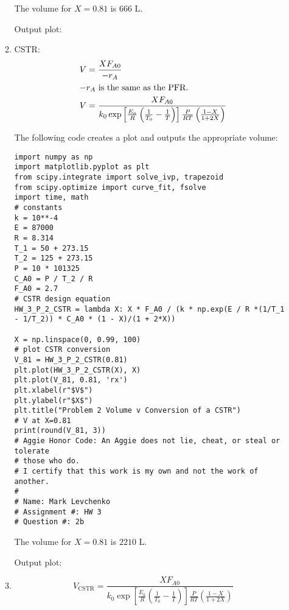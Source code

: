 \documentclass[12pt]{article}
\begin{document}
\begin{enumerate}
\begin{enumerate}
        The volume for $X=0.81$ is $\boxed{666\text{ L}}$.

        Output plot:

        

        
        \item CSTR:
        \begin{align*}
            V &= \frac{XF_{A0}}{-r_A} \\
            \intertext{$-r_A$ is the same as the PFR.}
            V &= \frac{XF_{A0}}{k_0 \exp\left[ \frac{E_a}{R} \left( \frac{1}{T_0} - \frac{1}{T} \right) \right] \frac{P}{RT} \left( \frac{1 - X}{1 + 2 X} \right)}
        \end{align*}

        The following code creates a plot and outputs the appropriate volume:

\begin{verbatim}
import numpy as np
import matplotlib.pyplot as plt
from scipy.integrate import solve_ivp, trapezoid
from scipy.optimize import curve_fit, fsolve
import time, math
# constants
k = 10**-4
E = 87000
R = 8.314
T_1 = 50 + 273.15
T_2 = 125 + 273.15
P = 10 * 101325
C_A0 = P / T_2 / R
F_A0 = 2.7
# CSTR design equation
HW_3_P_2_CSTR = lambda X: X * F_A0 / (k * np.exp(E / R *(1/T_1 - 1/T_2)) * C_A0 * (1 - X)/(1 + 2*X))

X = np.linspace(0, 0.99, 100)
# plot CSTR conversion
V_81 = HW_3_P_2_CSTR(0.81)
plt.plot(HW_3_P_2_CSTR(X), X)
plt.plot(V_81, 0.81, 'rx')
plt.xlabel(r"$V$")
plt.ylabel(r"$X$")
plt.title("Problem 2 Volume v Conversion of a CSTR")
# V at X=0.81
print(round(V_81, 3))
# Aggie Honor Code: An Aggie does not lie, cheat, or steal or tolerate
# those who do.
# I certify that this work is my own and not the work of another.
#
# Name: Mark Levchenko
# Assignment #: HW 3
# Question #: 2b
\end{verbatim}

        The volume for $X=0.81$ is $\boxed{2210\text{ L}}$.

        Output plot:

        
        
        \item

        \[
            V_{\mathrm{CSTR}} = \frac{XF_{A0}}{k_0 \exp\left[ \frac{E_a}{R} \left( \frac{1}{T_0} - \frac{1}{T} \right) \right] \frac{P}{RT} \left( \frac{1 - X}{1 + 2 X} \right)}
        \]


\end{enumerate}
\end{enumerate}
\end{document}
